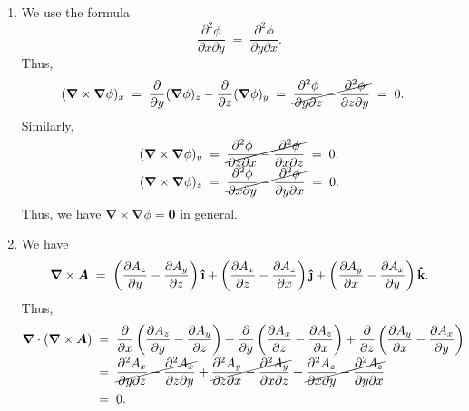 \documentclass[10pt]{article}
\let\vec\boldsymbol
\newcommand{\uveci}{{\bm{\hat{\textnormal{\bfseries\i}}}}}
\newcommand{\uvecj}{{\bm{\hat{\textnormal{\bfseries\j}}}}}
\newcommand{\uveck}{{\bm{\hat{\textnormal{\bfseries k}}}}}
\newcommand\grad[1]{\vec{\nabla}#1}
\newcommand\divg[1]{\vec{\nabla}\cdot#1}
\newcommand\curl[1]{\vec{\nabla}\times#1}
\begin{document}
\begin{enumerate}
                \item We use the formula
                \[
                        \frac{\partial^2 \phi}{\partial x \partial y} \;=\; \frac{\partial^2 \phi}{\partial y \partial x}.
                \]
                Thus,
                \begin{align*}
                        (\curl{\grad{\phi}})_x \;&=\; \frac{\partial}{\partial y} (\grad{\phi})_z - \frac{\partial}{\partial z} (\grad{\phi})_y 
                                \;=\; \cancel{\frac{\partial^2 \phi}{\partial y \partial z} - \frac{\partial^2 \phi}{\partial z \partial y} }
                                \;=\; 0.
                \end{align*}
                Similarly,
                \begin{align*}
                        (\curl{\grad{\phi}})_y 
                                \;&=\; \cancel{\frac{\partial^2 \phi}{\partial z \partial x} - \frac{\partial^2 \phi}{\partial x \partial z}} \;=\; 0. \\
                        (\curl{\grad{\phi}})_z 
                                \;&=\; \cancel{\frac{\partial^2 \phi}{\partial x \partial y} - \frac{\partial^2 \phi}{\partial y \partial x}} \;=\; 0.
                \end{align*}
                Thus, we have $\curl{\grad{\phi}} = \vec{0}$ in general.

                \item We have
                \[
                        \curl{\vec{A}} \;=\; \left(\frac{\partial A_z}{\partial y} - \frac{\partial A_y}{\partial z}\right)\uveci + 
                                \left(\frac{\partial A_x}{\partial z} - \frac{\partial A_z}{\partial x}\right)\uvecj + 
                                \left(\frac{\partial A_y}{\partial x} - \frac{\partial A_x}{\partial y}\right)\uveck.
                \]
                Thus,
                \begin{align*}
                        \divg{(\curl{\vec{A}})} \;&=\;
                                \frac{\partial}{\partial x}\left(\frac{\partial A_z}{\partial y} - \frac{\partial A_y}{\partial z}\right) + 
                                \frac{\partial}{\partial y}\left(\frac{\partial A_x}{\partial z} - \frac{\partial A_z}{\partial x}\right) + 
                                \frac{\partial}{\partial z}\left(\frac{\partial A_y}{\partial x} - \frac{\partial A_x}{\partial y}\right) \\
                        \;&=\;  \cancel{\frac{\partial^2 A_x}{\partial y \partial z} - \frac{\partial^2 A_x}{\partial z \partial y}} + 
                                \cancel{\frac{\partial^2 A_y}{\partial z \partial x} - \frac{\partial^2 A_y}{\partial x \partial z}} + 
                                \cancel{\frac{\partial^2 A_z}{\partial x \partial y} - \frac{\partial^2 A_z}{\partial y \partial x}} \\
                        \;&=\; 0.
                \end{align*}
        \end{enumerate}
\end{document}

